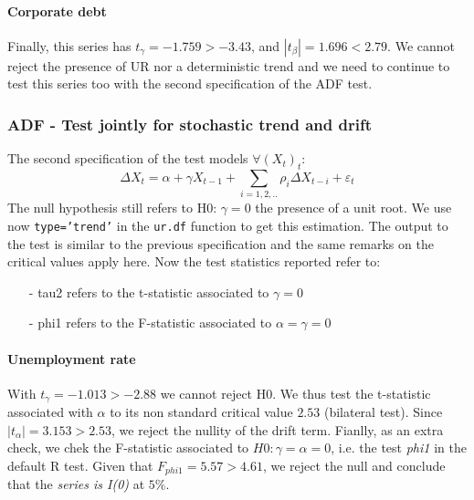 \documentclass[hidelinks,12pts]{article}
\DeclareMathOperator{\1}{\mathbbm{1}}
\begin{document}
\paragraph{Corporate debt}
Finally, this series has $t_\gamma = -1.759 > -3.43$, and $|t_\beta| = 1.696 < 2.79$. 
We cannot reject the presence of UR nor  a deterministic trend and we need to continue to test this series too with the second specification of the ADF test. 







\subsubsection{ADF - Test jointly for stochastic trend and drift}
The second specification of the test models $\forall (X_t)_t$: 
    \begin{equation}
        \Delta X_t = \alpha  + \gamma X_{t-1} +\sum_{i=1,2,..}\rho_i \Delta X_{t-i} + \varepsilon_t
    \end{equation}
The null hypothesis still refers to H0: $\gamma =0$ the presence of a unit root. 
We use now \texttt{type='trend'} in the \texttt{ur.df} function to get this estimation. 
The output to the test is similar to the previous specification and the same remarks on the critical values apply here. 
Now the test statistics reported refer to: 
    \begin{itemize}
        \item[-] tau2 refers to the t-statistic associated to $\gamma =0$ 
        \item[-] phi1 refers to the F-statistic associated to $\alpha = \gamma =0$ 
    \end{itemize}





\paragraph{Unemployment rate}
With $t_\gamma = -1.013> -2.88$ we cannot reject H0. 
We thus test the t-statistic associated with $\alpha$ to its non standard critical value $2.53$ (bilateral test). 
Since $|t_\alpha| = 3.153 > 2.53$, we reject the nullity of the drift term. 
Fianlly, as an extra check, we chek the F-statistic associated to $H0: \gamma= \alpha = 0$, i.e. the test \emph{phi1} in the default R test. 
Given that $F_{phi1} = 5.57 > 4.61$, we reject the null and conclude that the \emph{series is I(0)} at $5\%$. 
\end{document}
